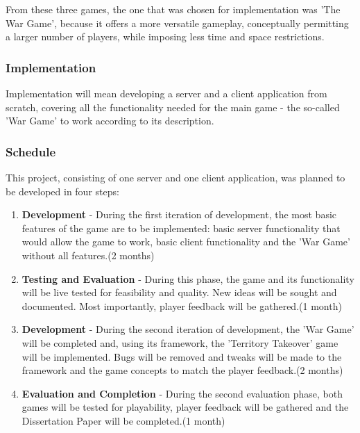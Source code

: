 From these three games, the one that was chosen for implementation was 'The War
Game', because it offers a more versatile gameplay, conceptually permitting
a larger number of players, while imposing less time and space restrictions.


\subsubsection{Implementation}

Implementation will mean developing a server and a client application from
scratch, covering all the functionality needed for the main game - the so-called
'War Game' to work according to its description.

\subsubsection{Schedule}
This project, consisting of one server and one client application, was planned
to be developed in four steps:


\begin{enumerate}
  \item \textbf{Development} - During the first iteration of development, the
  most basic features of the game are to be implemented: basic server
  functionality that would allow the game to work, basic client functionality
  and the 'War Game' without all features.(2 months)
  
  \item \textbf{Testing and Evaluation} - During this phase, the game and its
  functionality will be live tested for feasibility and quality. New ideas will
  be sought and documented. Most importantly, player feedback will be
  gathered.(1 month)
  
  \item \textbf{Development} - During the second iteration of development, the
  'War Game' will be completed and, using its framework, the 'Territory
  Takeover' game will be implemented. Bugs will be removed and tweaks will be
  made to the framework and the game concepts to match the player feedback.(2
  months)
  
  \item \textbf{Evaluation and Completion} - During the second evaluation phase,
  both games will be tested for playability, player feedback will be gathered
  and the Dissertation Paper will be completed.(1 month)
    
\end{enumerate}



